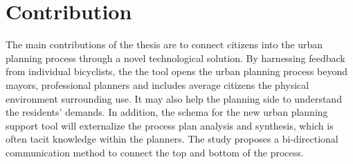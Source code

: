\section{Contribution}
The main contributions of the thesis are to connect citizens into the urban planning process through a novel technological
solution. By harnessing feedback from individual bicyclists, the the tool opens the urban planning process
beyond mayors, professional planners and includes average citizens  the physical
environment surrounding use. It may also help the planning side to understand the residents' demands.
In addition, the schema for the new urban planning support tool will externalize the process plan analysis and synthesis,
which is often tacit knowledge within the planners. The study proposes a bi-directional communication
method to connect the top and bottom of the process.
